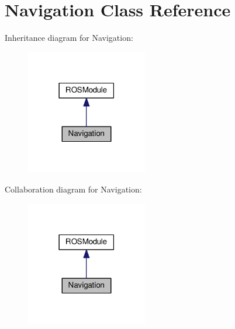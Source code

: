 \hypertarget{classNavigation}{}\section{Navigation Class Reference}
\label{classNavigation}


Inheritance diagram for Navigation\+:
\nopagebreak
\begin{figure}[H]
\begin{center}
\leavevmode
\includegraphics[width=150pt]{classNavigation__inherit__graph}
\end{center}
\end{figure}


Collaboration diagram for Navigation\+:
\nopagebreak
\begin{figure}[H]
\begin{center}
\leavevmode
\includegraphics[width=150pt]{classNavigation__coll__graph}
\end{center}
\end{figure}
